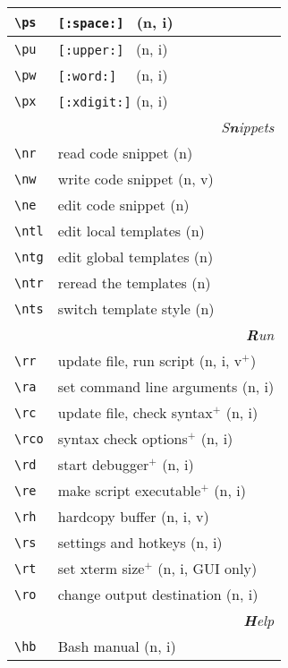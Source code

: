 \documentclass[oneside,12pt,a4paper,DIV18]{scrartcl}
\begin{document}
\begin{center}
\begin{tabular}[]{|p{11mm}|p{59mm}|}
\hline \verb'\ps'  &  \verb'[:space:] '         \hfill (n, i)\\
\hline \verb'\pu'  &  \verb'[:upper:] '         \hfill (n, i)\\
\hline \verb'\pw'  &  \verb'[:word:]  '         \hfill (n, i)\\
\hline \verb'\px'  &  \verb'[:xdigit:]'         \hfill (n, i)\\
\hline
\hline
\multicolumn{2}{|r|}{\textsl{S\textbf{n}ippets}}\\
\hline \verb'\nr'  & read code snippet          \hfill (n)\\
\hline \verb'\nw'  & write code snippet         \hfill (n, v)\\
\hline \verb'\ne'  & edit code snippet          \hfill (n)\\
%
\hline \verb'\ntl' & edit local templates      \hfill (n)\\
\hline \verb'\ntg' & edit global templates     \hfill (n)\\
\hline \verb'\ntr' & reread the templates      \hfill (n)\\
\hline \verb'\nts' & switch template style     \hfill (n)\\
\hline
\hline
\multicolumn{2}{|r|}{\textsl{\textbf{R}un}}\\
\hline \verb'\rr'  & update file, run script        \hfill (n, i, v$^+$)\\
\hline \verb'\ra'  & set command line arguments     \hfill (n, i)\\
\hline \verb'\rc'  & update file, check syntax$^+$  \hfill (n, i)\\
\hline \verb'\rco' & syntax check options$^+$       \hfill (n, i)\\
\hline \verb'\rd'  & start debugger$^+$             \hfill (n, i)\\
\hline \verb'\re'  & make script executable$^+$     \hfill (n, i)\\
\hline \verb'\rh'  & hardcopy buffer                \hfill (n, i, v)\\
\hline \verb'\rs'  & settings and hotkeys           \hfill (n, i)\\
\hline \verb'\rt'  & set xterm size$^+$             \hfill (n, i, GUI only)\\
\hline \verb'\ro'  & change output destination      \hfill (n, i)\\
\hline
\hline 
\multicolumn{2}{|r|}{\textsl{\textbf{H}elp}}\\
\hline \verb'\hb'  & Bash manual                     \hfill (n, i)\\

\end{tabular}
\end{center}
\end{document}
